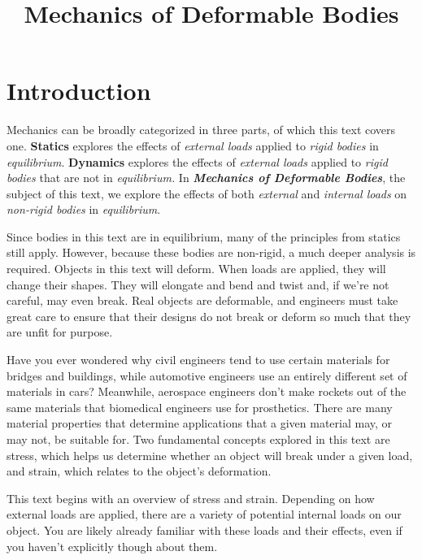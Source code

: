 \documentclass[
  letterpaper,
  DIV=11,
  numbers=noendperiod]{scrreprt}
\title{Mechanics of Deformable Bodies}
\author{}
\date{}
\renewcommand*\contentsname{Table of contents}
\newcommand\contentsname{Table of contents}
\begin{document}
\maketitle

\renewcommand*\contentsname{Table of contents}
{
\hypersetup{linkcolor=}
\setcounter{tocdepth}{2}
\tableofcontents
}

\chapter*{Introduction}\label{introduction}


Mechanics can be broadly categorized in three parts, of which this text
covers one. \textbf{Statics} explores the effects of \emph{external
loads} applied to \emph{rigid bodies} in \emph{equilibrium}.
\textbf{Dynamics} explores the effects of \emph{external loads} applied
to \emph{rigid bodies} that are not in \emph{equilibrium.} In
\textbf{\emph{Mechanics of Deformable Bodies}}, the subject of this
text, we explore the effects of both \emph{external} and \emph{internal
loads} on \emph{non-rigid bodies} in \emph{equilibrium}.

Since bodies in this text are in equilibrium, many of the principles
from statics still apply. However, because these bodies are non-rigid, a
much deeper analysis is required. Objects in this text will deform. When
loads are applied, they will change their shapes. They will elongate and
bend and twist and, if we're not careful, may even break. Real objects
are deformable, and engineers must take great care to ensure that their
designs do not break or deform so much that they are unfit for purpose.

Have you ever wondered why civil engineers tend to use certain materials
for bridges and buildings, while automotive engineers use an entirely
different set of materials in cars? Meanwhile, aerospace engineers don't
make rockets out of the same materials that biomedical engineers use for
prosthetics. There are many material properties that determine
applications that a given material may, or may not, be suitable for. Two
fundamental concepts explored in this text are stress, which helps us
determine whether an object will break under a given load, and strain,
which relates to the object's deformation.

This text begins with an overview of stress and strain. Depending on how
external loads are applied, there are a variety of potential internal
loads on our object. You are likely already familiar with these loads
and their effects, even if you haven't explicitly though about them.
\end{document}
